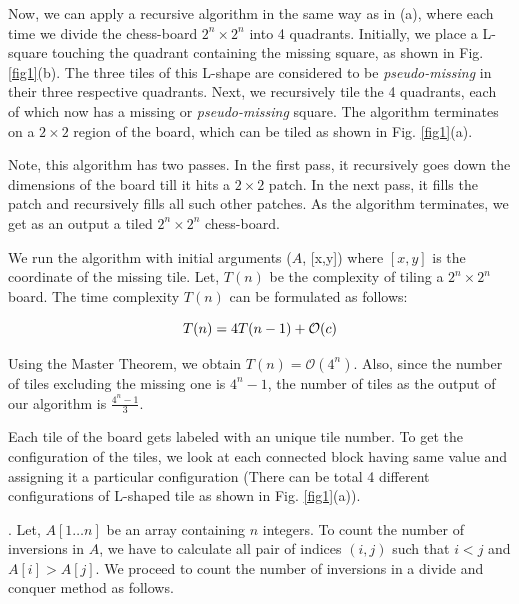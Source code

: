 \documentclass[assign]{article}
\begin{document}
\noindent Now, we can apply a recursive algorithm in the same way as in (a), where each time we divide the chess-board $2^n \times 2^n$ into 4 quadrants. Initially, we place a L-square touching the quadrant containing the missing square, as shown in Fig. \ref{fig1}(b). The three tiles of this L-shape are considered to be {\em pseudo-missing} in their three respective quadrants. Next, we recursively tile the 4 quadrants, each of which now has a missing or {\em pseudo-missing} square. The algorithm terminates on a $2 \times 2$ region of the board, which can be tiled as shown in Fig. \ref{fig1}(a).

\noindent Note, this algorithm has two passes. In the first pass, it recursively goes down the dimensions of the board till it hits a $2\times 2$ patch. In the next pass, it fills the patch and recursively fills all such other patches. As the algorithm terminates, we get as an output a tiled $2^n \times 2^n$ chess-board.

\noindent  We run the algorithm with initial arguments ($A$, [x,y]) where $[x,y]$ is the coordinate of the missing tile. Let, $T(n)$ be the complexity of tiling a $2^n \times 2^n$ board. The time complexity $T(n)$ can be formulated as follows:

\begin{equation}
   T(n) = 4T(n-1) + \mathcal{O}(c) \notag
\end{equation}

\noindent Using the Master Theorem, we obtain $T(n) = \mathcal{O}(4^n)$. Also, since the number of tiles excluding the missing one is $4^n-1$, the number of tiles as the output of our algorithm is $\frac{4^n-1}{3}$. 

\noindent Each tile of the board gets labeled with an unique tile number. To get the configuration of the tiles, we look at each connected block having same value and assigning it a particular configuration (There can be total 4 different configurations of L-shaped tile as shown in Fig. \ref{fig1}(a)).

\vspace{10pt}

. Let, $A\left[ 1\dots n\right]$ be an array containing $n$ integers.  To count the number of inversions in $A$, we have to calculate all pair of indices $\left( i,j\right)$ such that $i < j$ and $A[i] > A[j]$. We proceed to count the number of inversions in a divide and conquer method as follows.
\end{document}

